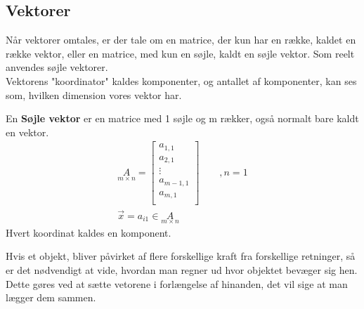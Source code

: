 \subsection{Vektorer}
Når vektorer omtales, er der tale om en matrice, der kun har en række, kaldet en række vektor, eller en matrice, med kun en søjle, kaldt en søjle vektor. Som reelt anvendes søjle vektorer. \\
Vektorens "koordinator" kaldes komponenter, og antallet af komponenter, kan ses som, hvilken dimension vores vektor har.
\begin{defn}
En \textbf{Søjle vektor} er en matrice med 1 søjle og m rækker, også normalt bare kaldt en vektor.
\begin{align*}
\underset{m \times n}{A} = 
\begin{bmatrix}
a_{1,1}\\
a_{2,1}\\
\vdots \\
a_{m-1,1}\\
a_{m,1} \\
\end{bmatrix}\qquad , n=1\\ %
\vec{x}=a_{i1}\in\underset{m \times n}{A}
\end{align*} 
Hvert koordinat kaldes en komponent.
\end{defn}
Hvis et objekt, bliver påvirket af flere forskellige kraft fra forskellige retninger, så er det nødvendigt at vide, hvordan man regner ud hvor objektet bevæger sig hen. Dette gøres ved at sætte vetorene i forlængelse af hinanden, det vil sige at man lægger dem sammen.
